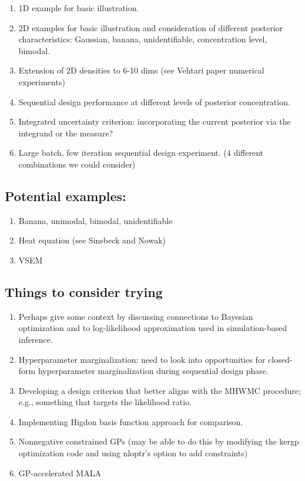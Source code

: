 \documentclass[12pt]{article}
\begin{document}
\begin{enumerate}
\item 1D example for basic illustration. 
\item 2D examples for basic illustration and consideration of different posterior characteristics: Gaussian, banana, unidentifiable, concentration level, bimodal. 
\item Extension of 2D densities to 6-10 dims (see Vehtari paper numerical experiments) 
\item Sequential design performance at different levels of posterior concentration. 
\item Integrated uncertainty criterion: incorporating the current posterior via the integrand or the measure?
\item Large batch, few iteration sequential design experiment. 
(4 different combinations we could consider) 
\end{enumerate}

\subsection{Potential examples:}
\begin{enumerate}
\item Banana, unimodal, bimodal, unidentifiable
\item Heat equation (see Sinsbeck and Nowak) 
\item VSEM
\end{enumerate}

\subsection{Things to consider trying}
\begin{enumerate}
\item Perhaps give some context by discussing connections to Bayesian optimization and to log-likelihood approximation used in 
simulation-based inference. 
\item Hyperparameter marginalization: need to look into opportunities for closed-form hyperparameter marginalization during 
sequential design phase. 
\item Developing a design criterion that better aligns with the MHWMC procedure; e.g., something that targets the likelihood ratio. 
\item Implementing Higdon basis function approach for comparison. 
\item Nonnegative constrained GPs (may be able to do this by modifying the kergp optimization code and using nloptr's option to add constraints) 
\item GP-accelerated MALA 
\end{enumerate}
\end{document}
